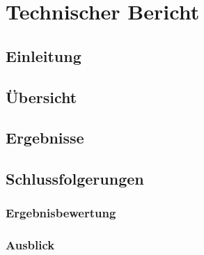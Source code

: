 \newcommand*{\TechBerichtPath}{./tex/techn_bericht}%


\section{Technischer Bericht}

\subsection{Einleitung}
\subsection{Übersicht}




\subsection{Ergebnisse}

\subsection{Schlussfolgerungen}
\subsubsection{Ergebnisbewertung}
\subsubsection{Ausblick}
